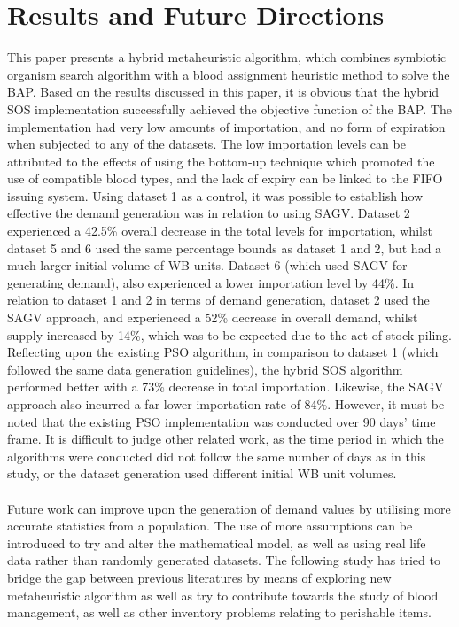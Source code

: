 \documentclass{article}
\begin{document}
\section{Results and Future Directions}
This paper presents a hybrid metaheuristic algorithm, which combines symbiotic organism search algorithm with a blood assignment heuristic method to solve the BAP. Based on the results discussed in this paper, it is obvious that the hybrid SOS implementation successfully achieved the objective function of the BAP. The implementation had very low amounts of importation, and no form of expiration when subjected to any of the datasets. The low importation levels can be attributed to the effects of using the bottom-up technique which promoted the use of compatible blood types, and the lack of expiry can be linked to the FIFO issuing system. Using dataset 1 as a control, it was possible to establish how effective the demand generation was in relation to using SAGV. Dataset 2 experienced a 42.5\% overall decrease in the total levels for importation, whilst dataset 5 and 6 used the same percentage bounds as dataset 1 and 2, but had a much larger initial volume of WB units. Dataset 6 (which used SAGV for generating demand), also experienced a lower importation level by 44\%. In relation to dataset 1 and 2 in terms of demand generation, dataset 2 used the SAGV approach, and experienced a 52\% decrease in overall demand, whilst supply increased by 14\%, which was to be expected due to the act of stock-piling. Reflecting upon the existing PSO algorithm, in comparison to dataset 1 (which followed the same data generation guidelines), the hybrid SOS algorithm performed better with a 73\% decrease in total importation. Likewise, the SAGV approach also incurred a far lower importation rate of 84\%. However, it must be noted that the existing PSO implementation was conducted over 90 days’ time frame. It is difficult to judge other related work, as the time period in which the algorithms were conducted did not follow the same number of days as in this study, or the dataset generation used different initial WB unit volumes. 
\\
\\
Future work can improve upon the generation of demand values by utilising more accurate statistics from a population. The use of more assumptions can be introduced to try and alter the mathematical model, as well as using real life data rather than randomly generated datasets. The following study has tried to bridge the gap between previous literatures by means of exploring new metaheuristic algorithm as well as try to contribute towards the study of blood management, as well as other inventory problems relating to perishable items. 
\end{document}
